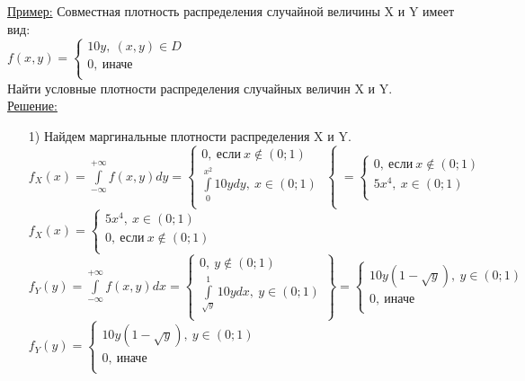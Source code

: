 \underline{Пример:} Совместная плотность распределения случайной величины X и Y имеет вид:\\
$f(x,y) = 
\begin{cases}
	10y, \ (x,y) \in D\\
	0, \ \text{иначе}\\
\end{cases}$\\
Найти условные плотности распределения случайных величин X и Y.\\
\underline{Решение:} 
\begin{enumerate}
	\item[1)] Найдем маргинальные плотности распределения X и Y.\\
	$\displaystyle  f_X(x) = \int\limits_{-\infty}^{+\infty} f(x,y) dy = \left\{
	\begin{array}{lll}
		0, \ \text{если} \ x \not\in (0;1)\\
		\int\limits_0^{x^2} 10y dy, \ x \in (0;1)\\
	\end{array} \right\{ = 
	\begin{cases}
		0, \ \text{если} \ x \not\in (0;1)\\
		5x^4, \ x \in (0;1)\\
	\end{cases}$\\

	$f_X(x) = 
	\begin{cases}
		5x^4, \ x \in (0;1)\\
		0, \ \text{если} \ x \not\in (0;1)\\
	\end{cases}$\\
	
	$\displaystyle  f_Y(y) = \int\limits_{-\infty}^{+\infty} f(x,y) dx = \left\{
	\begin{array}{lll}
		0, \ y \not\in (0;1)\\
		\int\limits_{\sqrt{y}}^1 10y dx, \ y \in (0;1)\\
	\end{array} \right\} = 
	\begin{cases}
		10y (1 - \sqrt{y}), \ y \in (0;1)\\
		0, \ \text{иначе}\\
	\end{cases}$\\
	
	$f_Y(y) = 
	\begin{cases}
		10y(1 - \sqrt{y}), \ y \in (0;1)\\
		0, \ \text{иначе}\\
	\end{cases}$\\
	

\end{enumerate}
